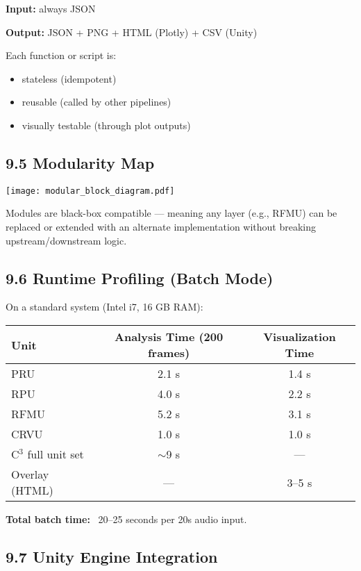\documentclass[10pt]{article}
\begin{document}
\textbf{Input:} always JSON

\textbf{Output:} JSON + PNG + HTML (Plotly) + CSV (Unity)

Each function or script is:

\begin{itemize}
    \item stateless (idempotent)
    \item reusable (called by other pipelines)
    \item visually testable (through plot outputs)
\end{itemize}

\subsection*{9.5 Modularity Map}

\begin{center}
\texttt{[image: modular\_block\_diagram.pdf]}
\end{center}

Modules are black-box compatible — meaning any layer (e.g., RFMU) can be replaced or extended with an alternate implementation without breaking upstream/downstream logic.

\subsection*{9.6 Runtime Profiling (Batch Mode)}

On a standard system (Intel i7, 16 GB RAM):

\begin{center}
\begin{tabular}{|l|c|c|}
\hline
\textbf{Unit} & \textbf{Analysis Time (200 frames)} & \textbf{Visualization Time} \\
\hline
PRU & 2.1 s & 1.4 s \\
RPU & 4.0 s & 2.2 s \\
RFMU & 5.2 s & 3.1 s \\
CRVU & 1.0 s & 1.0 s \\
C$^3$ full unit set & $\sim$9 s & — \\
Overlay (HTML) & — & 3–5 s \\
\hline
\end{tabular}
\end{center}

\textbf{Total batch time:} ~20–25 seconds per 20s audio input.

\subsection*{9.7 Unity Engine Integration}
\end{document}
